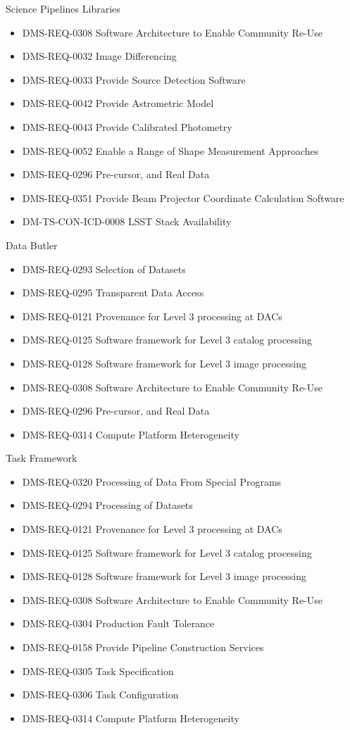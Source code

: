 Science Pipelines Libraries \begin{itemize}
\item DMS-REQ-0308 Software Architecture to Enable Community Re-Use
\item DMS-REQ-0032 Image Differencing
\item DMS-REQ-0033 Provide Source Detection Software
\item DMS-REQ-0042 Provide Astrometric Model
\item DMS-REQ-0043 Provide Calibrated Photometry
\item DMS-REQ-0052 Enable a Range of Shape Measurement Approaches
\item DMS-REQ-0296 Pre-cursor, and Real Data
\item DMS-REQ-0351 Provide Beam Projector Coordinate Calculation Software
\item DM-TS-CON-ICD-0008 LSST Stack Availability
\end{itemize}
Data Butler \begin{itemize}
\item DMS-REQ-0293 Selection of Datasets
\item DMS-REQ-0295 Transparent Data Access
\item DMS-REQ-0121 Provenance for Level 3 processing at DACs
\item DMS-REQ-0125 Software framework for Level 3 catalog processing
\item DMS-REQ-0128 Software framework for Level 3 image processing
\item DMS-REQ-0308 Software Architecture to Enable Community Re-Use
\item DMS-REQ-0296 Pre-cursor, and Real Data
\item DMS-REQ-0314 Compute Platform Heterogeneity
\end{itemize}
Task Framework \begin{itemize}
\item DMS-REQ-0320 Processing of Data From Special Programs
\item DMS-REQ-0294 Processing of Datasets
\item DMS-REQ-0121 Provenance for Level 3 processing at DACs
\item DMS-REQ-0125 Software framework for Level 3 catalog processing
\item DMS-REQ-0128 Software framework for Level 3 image processing
\item DMS-REQ-0308 Software Architecture to Enable Community Re-Use
\item DMS-REQ-0304 Production Fault Tolerance
\item DMS-REQ-0158 Provide Pipeline Construction Services
\item DMS-REQ-0305 Task Specification
\item DMS-REQ-0306 Task Configuration
\item DMS-REQ-0314 Compute Platform Heterogeneity
\end{itemize}
